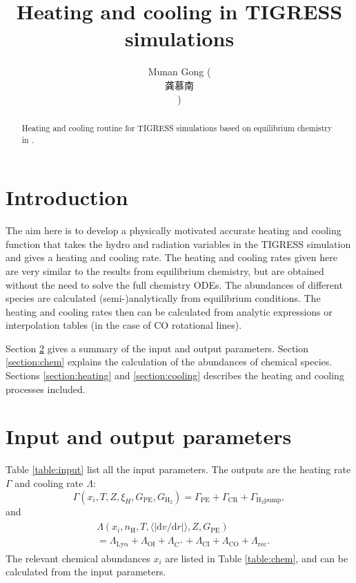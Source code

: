 \documentclass[iop,numberedappendix]{emulateapj}
\newcommand{\di}{\mathrm{d}}
\newcommand{\mr}{\mathrm}
\newcommand{\Ht}{\mathrm{H_2}}
\newcommand{\Ho}{\mathrm{H}}
\newcommand{\CO}{\mathrm{CO}}
\newcommand{\CI}{\mathrm{CI}}
\newcommand{\OI}{\mathrm{OI}}
\newcommand{\Cplus}{\mathrm{C^+}}
\begin{document}
\title{Heating and cooling in TIGRESS simulations}
\author{Munan Gong (\begin{CJK*}{UTF8}{gbsn}龚慕南\end{CJK*})}

\begin{abstract}
    Heating and cooling routine for TIGRESS simulations \citep{KO2017}
    based on equilibrium chemistry in \citep{GOW2016}.
\end{abstract}

\section{Introduction}
The aim here is to develop a physically motivated accurate 
heating and cooling function
that takes the hydro and radiation variables in the TIGRESS simulation and
gives a heating and cooling rate. The heating and cooling rates given here 
are very similar to the results from equilibrium chemistry, but are
obtained without the need to solve the full chemistry ODEs. The abundances of
different species are calculated (semi-)analytically from equilibrium conditions.
The heating and cooling rates then can be calculated from analytic expressions
or interpolation tables (in the case of $\CO$ rotational lines).

Section \ref{section:para} gives a summary of the input and output parameters.
Section \ref{section:chem} explains the calculation of the
abundances of chemical species. Sections \ref{section:heating} and
\ref{section:cooling} describes the heating and cooling processes included.

\section{Input and output parameters}\label{section:para}
Table \ref{table:input} list all the input parameters. The outputs are the
heating rate $\Gamma$ and cooling rate $\Lambda$:
\begin{equation}\label{eq:heating}
    \Gamma(x_i, T, Z, \xi_H, G_\mr{PE}, G_\Ht) = \Gamma_\mr{PE} + \Gamma_\mr{CR} +
    \Gamma_\mr{H_2 pump},
\end{equation}
and
\begin{align}\label{eq:cooling}
    \begin{split}
    &\Lambda(x_i, n_\Ho, T, \langle |\di v/\di r| \rangle, Z, G_\mr{PE}) \\
    &= \Lambda_\mr{Ly\alpha}+\Lambda_\OI + \Lambda_\Cplus +
    \Lambda_\CI + \Lambda_\CO + \Lambda_\mr{rec}.
    \end{split}
\end{align}
The relevant chemical abundances $x_i$ are listed in Table \ref{table:chem},
and can be calculated from the input parameters.
\end{document}
